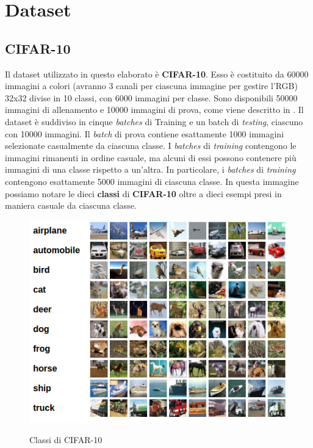 \section{Dataset} 
\subsection{CIFAR-10}
Il dataset utilizzato in questo elaborato è \textbf{CIFAR-10}.
Esso è costituito da 60000 immagini a colori (avranno 3 canali per ciascuna immagine per gestire l'RGB) 32x32 divise in 10 classi, con 6000 immagini per classe. Sono disponibili 50000 immagini di allenamento e 10000 immagini di prova, come viene descritto in \cite{Cifar}.\newline
Il dataset è suddiviso in cinque \textit{batches} di Training e un batch di \textit{testing}, ciascuno con 10000 immagini. Il \textit{batch} di prova contiene esattamente 1000 immagini selezionate casualmente da ciascuna classe. I \textit{batches} di \textit{training} contengono le immagini rimanenti in ordine casuale, ma alcuni di essi possono contenere più immagini di una classe rispetto a un'altra. In  particolare, i \textit{batches} di \textit{training} contengono esattamente 5000 immagini di ciascuna classe.
\newpage
In questa immagine possiamo notare le dieci \textbf{classi} di \textbf{CIFAR-10} oltre a dieci esempi presi in maniera casuale da ciascuna classe.
\begin{figure}[ht]
\centering
\caption{Classi di CIFAR-10}
\includegraphics[width=\linewidth]{img/CIFAR.png}
\label{figure : CIFAR-10}
\end{figure}

